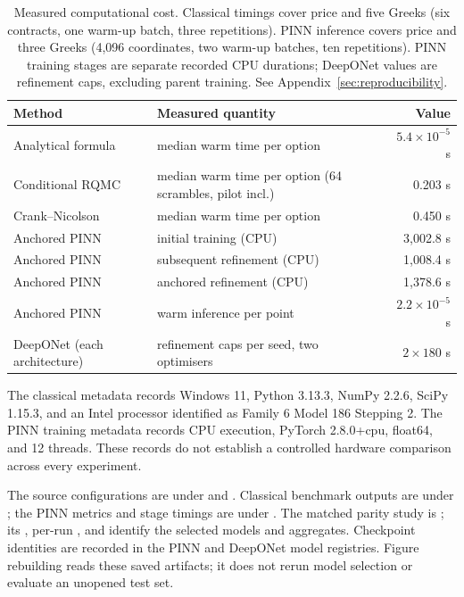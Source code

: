 \documentclass[11pt,a4paper]{article}
\begin{document}
\begin{table}[!ht]\centering\footnotesize
\caption{Measured computational cost. Classical timings cover price and five Greeks (six contracts, one warm-up batch, three repetitions). PINN inference covers price and three Greeks (4,096 coordinates, two warm-up batches, ten repetitions). PINN training stages are separate recorded CPU durations; DeepONet values are refinement caps, excluding parent training. See Appendix~\ref{sec:reproducibility}.}
\label{tab:cost}
\begin{tabular}{llr}\toprule
Method & Measured quantity & Value\\\midrule
Analytical formula & median warm time per option & $5.4\times10^{-5}$ s\\
Conditional RQMC & median warm time per option (64 scrambles, pilot incl.) & 0.203 s\\
Crank--Nicolson & median warm time per option & 0.450 s\\
Anchored PINN & initial training (CPU) & 3,002.8 s\\
Anchored PINN & subsequent refinement (CPU) & 1,008.4 s\\
Anchored PINN & anchored refinement (CPU) & 1,378.6 s\\
Anchored PINN & warm inference per point & $2.2\times10^{-5}$ s\\
DeepONet (each architecture) & refinement caps per seed, two optimisers & $2\times180$ s\\\bottomrule
\end{tabular}\end{table}
The classical metadata records Windows 11, Python 3.13.3, NumPy 2.2.6, SciPy 1.15.3, and an Intel processor identified as Family 6 Model 186 Stepping 2. The PINN training metadata records CPU execution, PyTorch 2.8.0+cpu, float64, and 12 threads. These records do not establish a controlled hardware comparison across every experiment.

The source configurations are under  and . Classical benchmark outputs are under ; the PINN metrics and stage timings are under . The matched parity study is ; its , per-run , and  identify the selected models and aggregates. Checkpoint identities are recorded in the PINN and DeepONet model registries. Figure rebuilding reads these saved artifacts; it does not rerun model selection or evaluate an unopened test set.
\end{document}
